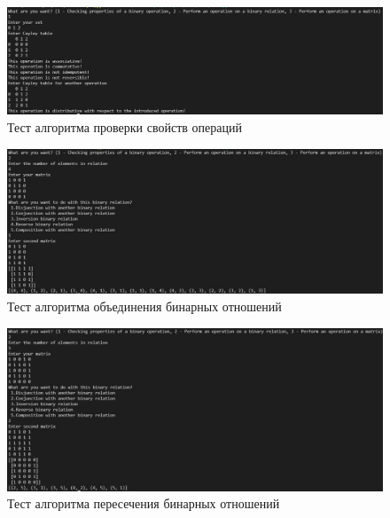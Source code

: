 \documentclass[spec, och, labwork]{shiza}
\begin{document}
\begin{figure}[H]
    \centering      %
    \includegraphics[width=1.\textwidth]{1}
    \caption{Тест алгоритма проверки свойств операций}
    \label{fig:image1}
\end{figure}

\begin{figure}[H]
    \centering      %
    \includegraphics[width=1.\textwidth]{2}
    \caption{Тест алгоритма объединения бинарных отношений}
    \label{fig:image1}
\end{figure}

\begin{figure}[H]
    \centering      %
    \includegraphics[width=1.\textwidth]{3}
    \caption{Тест алгоритма пересечения бинарных отношений}
    \label{fig:image1}
\end{figure}
\end{document}
